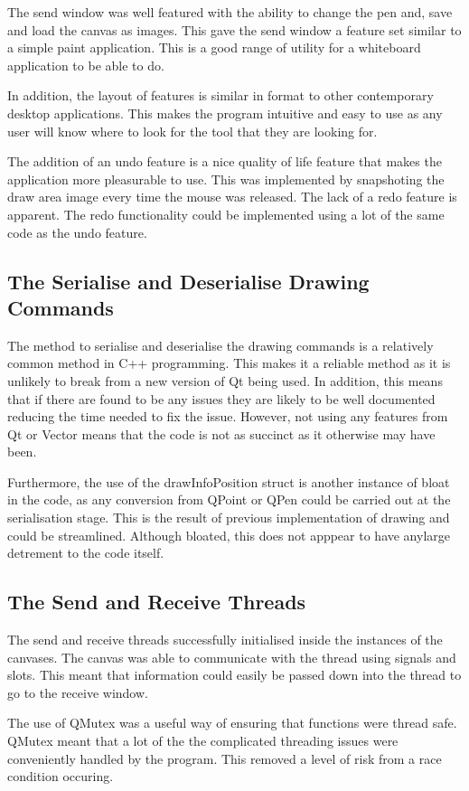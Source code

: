 \documentclass[10pt]{article}
\begin{document}
\begin{multicols*}{2}
The send window was well featured with the ability to change the pen and, save and load the canvas as images. This gave the send window a feature set similar to a simple paint application. This is a good range of utility for a whiteboard application to be able to do.

In addition, the layout of features is similar in format to other contemporary desktop applications. This makes the program intuitive and easy to use as any user will know where to look for the tool that they are looking for.

The addition of an undo feature is a nice quality of life feature that makes the application more pleasurable to use. This was implemented by snapshoting the draw area image every time the mouse was released. The lack of a redo feature is apparent. The redo functionality could be implemented using a lot of the same code as the undo feature.

\subsection{The Serialise and Deserialise Drawing Commands}
The method to serialise and deserialise the drawing commands is a relatively common method in C++ programming. This makes it a reliable method as it is unlikely to break from a new version of Qt being used. In addition, this means that if there are found to be any issues they are likely to be well documented reducing the time needed to fix the issue. However, not using any features from Qt or Vector means that the code is not as succinct as it otherwise may have been.

Furthermore, the use of the drawInfoPosition struct is another instance of bloat in the code, as any conversion from QPoint or QPen could be carried out at the serialisation stage. This is the result of previous implementation of drawing and could be streamlined. Although bloated, this does not apppear to have anylarge detrement to the code itself.

\subsection{The Send and Receive Threads}
The send and receive threads successfully initialised inside the instances of the canvases. The canvas was able to communicate with the thread using signals and slots. This meant that information could easily be passed down into the thread to go to the receive window.

The use of QMutex was a useful way of ensuring that functions were thread safe. QMutex meant that a lot of the the complicated threading issues were conveniently handled by the program. This removed a level of risk from a race condition occuring.


\end{multicols*}
\end{document}
